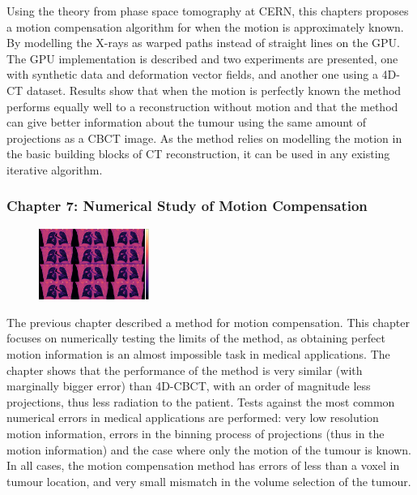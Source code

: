 Using the theory from phase space tomography at CERN, this chapters proposes a motion compensation algorithm for when the motion is approximately known. By modelling the X-rays as warped paths instead of straight lines on the GPU. The GPU implementation is described and two experiments are presented, one with synthetic data and deformation  vector fields, and another one using a 4D-CT dataset. Results show that when the motion is perfectly known the method performs equally well to a reconstruction without motion and that the method can give better information about the tumour using the same amount of projections as a CBCT image. As the method relies on modelling the motion in the basic building blocks of CT reconstruction, it can be used in any existing iterative algorithm.



\newpage
\FloatBarrier
\subsubsection{Chapter 7: Numerical Study of Motion Compensation}

\begin{figure}
\centering
\includegraphics[width=0.32\textwidth]{accuracyMC/4DCBCT3stage.png}
\end{figure}
The previous chapter described a method for motion compensation. This chapter focuses on numerically testing the limits of the method, as obtaining perfect motion information is an almost impossible task in medical applications. The chapter shows that the performance of the method is very similar (with marginally bigger error) than 4D-CBCT, with an order of magnitude less projections, thus less radiation to the patient. Tests against the most common numerical errors in medical applications are performed: very low resolution motion information, errors in the binning process of projections (thus in the motion information) and the case where only the motion of the tumour is known. In all cases, the motion compensation method has errors of less than a voxel in tumour location, and very small mismatch in the volume selection of the tumour.




